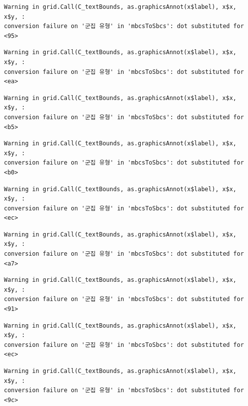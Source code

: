 \documentclass[
  letterpaper,
  DIV=11,
  numbers=noendperiod]{scrreprt}
\begin{document}
\begin{verbatim}
Warning in grid.Call(C_textBounds, as.graphicsAnnot(x$label), x$x, x$y, :
conversion failure on '군집 유형' in 'mbcsToSbcs': dot substituted for <95>
\end{verbatim}

\begin{verbatim}
Warning in grid.Call(C_textBounds, as.graphicsAnnot(x$label), x$x, x$y, :
conversion failure on '군집 유형' in 'mbcsToSbcs': dot substituted for <ea>
\end{verbatim}

\begin{verbatim}
Warning in grid.Call(C_textBounds, as.graphicsAnnot(x$label), x$x, x$y, :
conversion failure on '군집 유형' in 'mbcsToSbcs': dot substituted for <b5>
\end{verbatim}

\begin{verbatim}
Warning in grid.Call(C_textBounds, as.graphicsAnnot(x$label), x$x, x$y, :
conversion failure on '군집 유형' in 'mbcsToSbcs': dot substituted for <b0>
\end{verbatim}

\begin{verbatim}
Warning in grid.Call(C_textBounds, as.graphicsAnnot(x$label), x$x, x$y, :
conversion failure on '군집 유형' in 'mbcsToSbcs': dot substituted for <ec>
\end{verbatim}

\begin{verbatim}
Warning in grid.Call(C_textBounds, as.graphicsAnnot(x$label), x$x, x$y, :
conversion failure on '군집 유형' in 'mbcsToSbcs': dot substituted for <a7>
\end{verbatim}

\begin{verbatim}
Warning in grid.Call(C_textBounds, as.graphicsAnnot(x$label), x$x, x$y, :
conversion failure on '군집 유형' in 'mbcsToSbcs': dot substituted for <91>
\end{verbatim}

\begin{verbatim}
Warning in grid.Call(C_textBounds, as.graphicsAnnot(x$label), x$x, x$y, :
conversion failure on '군집 유형' in 'mbcsToSbcs': dot substituted for <ec>
\end{verbatim}

\begin{verbatim}
Warning in grid.Call(C_textBounds, as.graphicsAnnot(x$label), x$x, x$y, :
conversion failure on '군집 유형' in 'mbcsToSbcs': dot substituted for <9c>
\end{verbatim}
\end{document}
